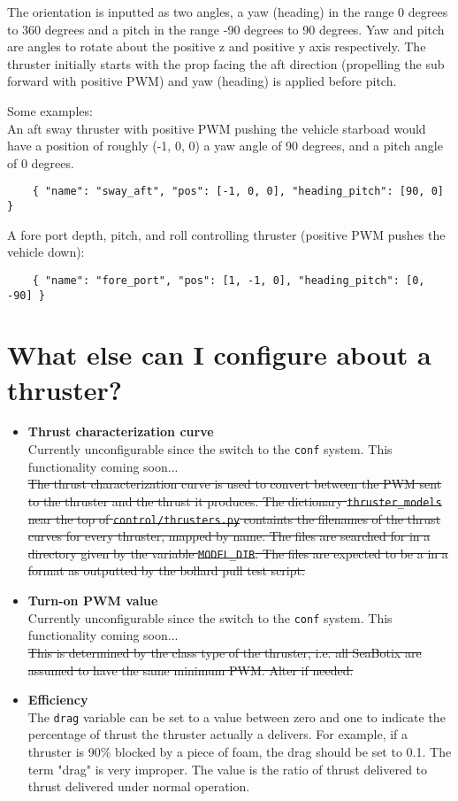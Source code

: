 \documentclass[11pt]{article}
\newcommand{\question}[1] %
{
  \section{#1}
}
\begin{document}
    The orientation is inputted as two angles, a yaw (heading) in the range 0 degrees to 360 degrees and a pitch in the range -90 degrees to 90 degrees. Yaw and pitch are angles to rotate about the positive z and positive y axis respectively. The thruster initially starts with the prop facing the aft direction (propelling the sub forward with positive PWM) and yaw (heading) is applied before pitch.

    Some examples:\\
    An aft sway thruster with positive PWM pushing the vehicle starboad would have a position of roughly (-1, 0, 0) a yaw angle of 90 degrees, and a pitch angle of 0 degrees.\\
    \begin{verbatim}
    { "name": "sway_aft", "pos": [-1, 0, 0], "heading_pitch": [90, 0] }
    \end{verbatim}
    A fore port depth, pitch, and roll controlling thruster (positive PWM pushes the vehicle down):
    \begin{verbatim}
    { "name": "fore_port", "pos": [1, -1, 0], "heading_pitch": [0, -90] }
    \end{verbatim}

\question{What else can I configure about a thruster?}

    \begin{itemize}
        \item \textbf{Thrust characterization curve}\\
        Currently unconfigurable since the switch to the \texttt{conf} system. This functionality coming soon...\\
        \st{The thrust characterization curve is used to convert between the PWM sent to the thruster and the thrust it produces. The dictionary \texttt{thruster\_models} near the top of \texttt{control/thrusters.py} containts the filenames of the thrust curves for every thruster, mapped by name. The files are searched for in a directory given by the variable \texttt{MODEL\_DIR}. The files are expected to be a in a format as outputted by the bollard pull test script.}
        \item \textbf{Turn-on PWM value}\\
        Currently unconfigurable since the switch to the \texttt{conf} system. This functionality coming soon...\\
        \st{This is determined by the class type of the thruster, i.e. all SeaBotix are assumed to have the same minimum PWM. Alter if needed.}
        \item \textbf{Efficiency}\\
        The \texttt{drag} variable can be set to a value between zero and one to indicate the percentage of thrust the thruster actually a delivers. For example, if a thruster is 90\% blocked by a piece of foam, the drag should be set to 0.1. The term "drag" is very improper. The value is the ratio of thrust delivered to thrust delivered under normal operation.
    \end{itemize}
\end{document}
